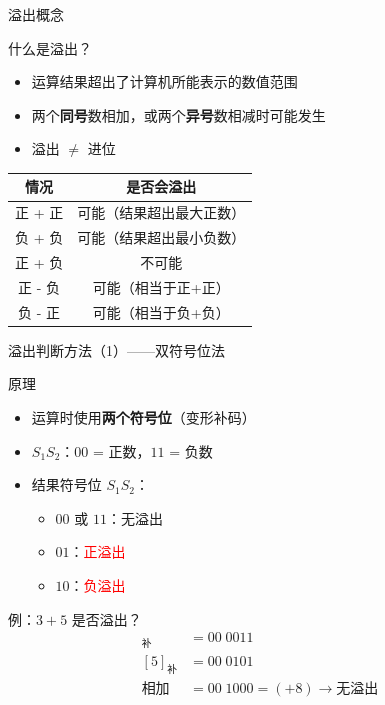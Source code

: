 \documentclass[10pt, aspectratio=169]{beamer}
\begin{document}
\begin{frame}{溢出概念}
    \begin{block}{什么是溢出？}
        \begin{itemize}
            \item 运算结果超出了计算机所能表示的数值范围
            \item 两个\textbf{同号}数相加，或两个\textbf{异号}数相减时可能发生
            \item 溢出 $\neq$ 进位
        \end{itemize}
    \end{block}
    \vspace{0.5em}
    \begin{tabular}{|c|c|}
        \hline
        \textbf{情况} & \textbf{是否会溢出} \\
        \hline
        正 + 正 & 可能（结果超出最大正数） \\
        \hline
        负 + 负 & 可能（结果超出最小负数） \\
        \hline
        正 + 负 & 不可能 \\
        \hline
        正 - 负 & 可能（相当于正+正） \\
        \hline
        负 - 正 & 可能（相当于负+负） \\
        \hline
    \end{tabular}
\end{frame}

\begin{frame}{溢出判断方法（1）——双符号位法}
    \begin{block}{原理}
        \begin{itemize}
            \item 运算时使用\textbf{两个符号位}（变形补码）
            \item $S_1S_2$：$00$ = 正数，$11$ = 负数
            \item 结果符号位 $S_1S_2$：
            \begin{itemize}
                \item $00$ 或 $11$：无溢出
                \item $01$：\textcolor{red}{正溢出}
                \item $10$：\textcolor{red}{负溢出}
            \end{itemize}
        \end{itemize}
    \end{block}
    \vspace{0.3em}
    \begin{exampleblock}{例：$3 + 5$ 是否溢出？}
        \begin{align*}
            [3]_{\text{补}} &= 00\;0011 \\
            [5]_{\text{补}} &= 00\;0101 \\
            \text{相加} &= 00\;1000 = (+8) \to \text{无溢出}
        \end{align*}
    \end{exampleblock}
\end{frame}
\end{document}
